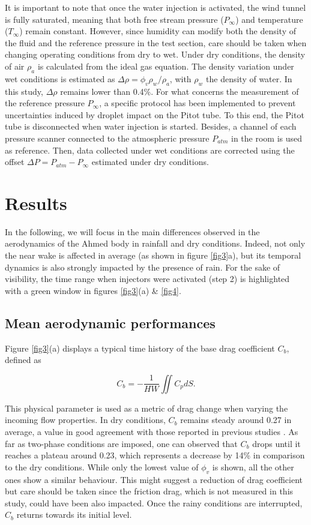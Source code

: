\documentclass[doublecol]{epl2}
\begin{document}
It is important to note that once the water injection is activated, the wind tunnel is fully saturated, meaning that both free stream pressure ($P_\infty$) and temperature ($T_\infty$) remain constant. However, since humidity can modify both the density of the fluid and the reference pressure in the test section, care should be taken when changing operating conditions from dry to wet. Under dry conditions, the density of air $\rho_a$ is calculated from the ideal gas equation. The density variation under wet conditions is estimated as $\Delta \rho = \phi_v\rho_w/\rho_a$, with $\rho_w$ the density of water. In this study, $\Delta \rho$ remains lower than 0.4\%. For what concerns the measurement of the reference pressure $P_\infty$, a specific protocol has been implemented to prevent uncertainties induced by droplet impact on the Pitot tube. To this end, the Pitot tube is disconnected when water injection is started. Besides, a channel of each pressure scanner connected to the atmospheric pressure $P_{atm}$ in the room is used as reference. Then, data collected under wet conditions are corrected using the offset $\Delta P = P_{atm} - P_\infty$ estimated under dry conditions.

\section{Results}
In the following, we will focus in the main differences observed in the aerodynamics of the Ahmed body in rainfall and dry conditions. Indeed, not only  the near wake is affected in average (as shown in figure \ref{fig3}a), but its temporal dynamics is also strongly impacted by the presence of rain. For the sake of visibility, the time range when injectors were activated (step 2) is highlighted with a green window in figures \ref{fig3}(a) \& \ref{fig4}.


\subsection{Mean aerodynamic performances}

Figure \ref{fig3}(a) displays a typical time history of the base drag coefficient $C_b$, defined as

\begin{equation}
C_b = -\frac{1}{HW} \iint C_p dS.
\end{equation}

\noindent This physical parameter is used as a metric of drag change when varying the incoming flow properties.  In dry conditions, $C_b$ remains steady around 0.27 in average, a value in good agreement with those reported in previous studies \cite{passaggia2021,zeidan2023near}. As far as two-phase conditions are imposed, one can observed that $C_b$ drops until it reaches a plateau around 0.23, which represents a decrease by 14\% in comparison to the dry conditions. While only the lowest value of $\phi_v$ is shown, all the other ones show a similar behaviour. This might suggest a reduction of drag coefficient but care should be taken since the friction drag, which is not measured in this study, could have been also impacted. Once the rainy conditions are interrupted, $C_b$ returns towards its initial level.
\end{document}
